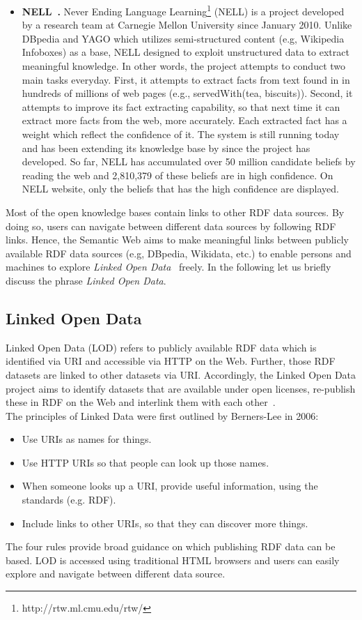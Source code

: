 \begin{itemize}
\item \textbf{NELL~\cite{DBLP:conf/wsdm/CarlsonBWHM10}.} Never Ending Language Learning\footnote{http://rtw.ml.cmu.edu/rtw/} (NELL) is a project developed by a research team at Carnegie Mellon University since January 2010. Unlike DBpedia and YAGO which utilizes semi-structured content (e.g, Wikipedia Infoboxes)  as a base, NELL designed to exploit unstructured data to extract meaningful knowledge. In other words, the project attempts to conduct two main tasks everyday.
First, it attempts to extract facts from text found in in hundreds of millions of web pages (e.g., servedWith(tea, biscuits)).
Second, it attempts to improve its fact extracting capability, so that next time it can extract more facts from the web, more accurately. Each extracted fact has a weight which reflect the confidence of it. The system is still running today and has been extending its knowledge base by since the project has developed. So far, NELL has accumulated over 50 million candidate beliefs by reading the web and 2,810,379 of these beliefs are in high confidence. On NELL website, only the beliefs that has the high confidence are displayed. 
\end{itemize}\vspace{0.5cm}
\noindent Most of the open knowledge bases contain links to other RDF data sources. By doing so, users can navigate between
different data sources by following RDF links. Hence, the Semantic Web aims to make meaningful links between publicly available RDF data sources (e.g, DBpedia, Wikidata, etc.) to enable persons and machines to explore \textit{Linked Open Data}~\cite{} freely. In the following let us  briefly discuss the phrase \textit{Linked Open Data}.\\

\subsection{Linked Open Data}
Linked Open Data (LOD) refers to publicly available RDF data which is identified via URI and accessible via HTTP on the Web. Further, those RDF datasets are linked to other datasets via URI. Accordingly, the Linked Open Data project aims to identify datasets that are available under open licenses, re-publish
these in RDF on the Web and interlink them with each other~\cite{DBLP:conf/www/BizerHIB08}. \\
The principles of Linked Data were first outlined by Berners-Lee in 2006:
\begin{itemize}
\item Use URIs as names for things.
\item Use HTTP URIs so that people can look up those names.
\item When someone looks up a URI, provide useful information, using the standards (e.g. RDF).
\item Include links to other URIs, so that they can discover more
things.
\end{itemize}
The four rules provide broad guidance on which publishing RDF data can be based. LOD is accessed using traditional HTML
browsers and users can easily explore and navigate between different data source.

